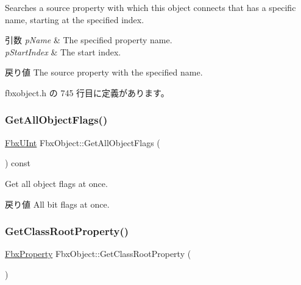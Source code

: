Searches a source property with which this object connects that has a specific name, starting at the specified index. 
\begin{DoxyParams}{引数}
{\em p\+Name} & The specified property name. \\
\hline
{\em p\+Start\+Index} & The start index. \\
\hline
\end{DoxyParams}
\begin{DoxyReturn}{戻り値}
The source property with the specified name. 
\end{DoxyReturn}


 fbxobject.\+h の 745 行目に定義があります。

\mbox{\label{class_fbx_object_a18b30c43de008570c05f3a6f1e46eb10}} 
\subsubsection{\texorpdfstring{Get\+All\+Object\+Flags()}{GetAllObjectFlags()}}
{\footnotesize\ttfamily \hyperlink{fbxtypes_8h_ae9fb141d8158a730aa85ec5ff2ea3f6b}{Fbx\+U\+Int} Fbx\+Object\+::\+Get\+All\+Object\+Flags (\begin{DoxyParamCaption}{ }\end{DoxyParamCaption}) const}

Get all object flags at once. \begin{DoxyReturn}{戻り値}
All bit flags at once. 
\end{DoxyReturn}
\mbox{\label{class_fbx_object_a70e190147f28712dee1ec1e00b73c24e}} 
\subsubsection{\texorpdfstring{Get\+Class\+Root\+Property()}{GetClassRootProperty()}}
{\footnotesize\ttfamily \hyperlink{class_fbx_property}{Fbx\+Property} Fbx\+Object\+::\+Get\+Class\+Root\+Property (\begin{DoxyParamCaption}{ }\end{DoxyParamCaption})}

